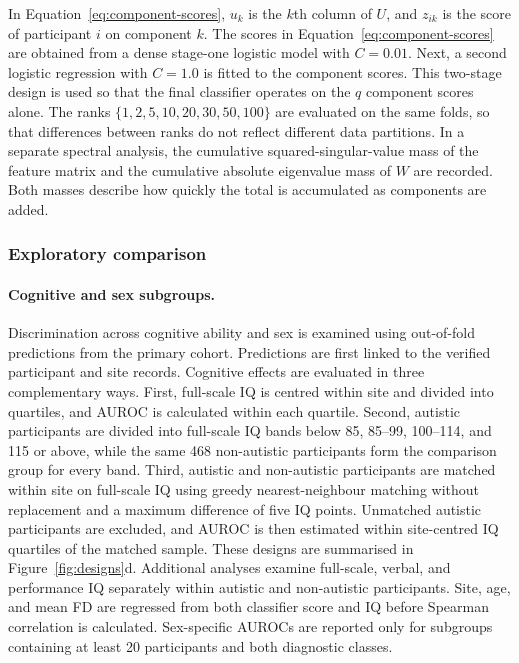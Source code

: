 In Equation~\eqref{eq:component-scores}, $u_k$ is the $k$th column of $U$, and $z_{ik}$ is the score of
participant $i$ on component $k$. The scores in Equation~\eqref{eq:component-scores} are obtained from a
dense stage-one logistic model with $C=0.01$. Next, a second logistic regression with
$C=1.0$ is fitted to the component scores. This two-stage design is used so that the final
classifier operates on the $q$ component scores alone. The ranks $\{1,2,5,10,20,30,50,100\}$
are evaluated on the same folds, so that differences between ranks do not reflect different
data partitions. In a separate spectral analysis, the cumulative squared-singular-value mass
of the feature matrix and the cumulative absolute eigenvalue mass of $W$ are recorded. Both
masses describe how quickly the total is accumulated as components are added.

\subsubsection{Exploratory comparison}
\label{subsubsec:exploratory-comparisons}

\paragraph{\textbf{Cognitive and sex subgroups.}}
\label{par:cognitive-sex-subgroups}
Discrimination across cognitive ability and sex is examined using out-of-fold predictions from the primary cohort. Predictions are first linked to the verified participant and site records. Cognitive effects are evaluated in three complementary ways. First, full-scale IQ is centred within site and divided into quartiles, and AUROC is calculated within each quartile. Second, autistic participants are divided into full-scale IQ bands below 85, 85--99, 100--114, and 115 or above, while the same 468 non-autistic participants form the comparison group for every band. Third, autistic and non-autistic participants are matched within site on full-scale IQ using greedy nearest-neighbour matching without replacement and a maximum difference of five IQ points. Unmatched autistic participants are excluded, and AUROC is then estimated within site-centred IQ quartiles of the matched sample. These designs are summarised in Figure~\ref{fig:designs}d. Additional analyses examine full-scale, verbal, and performance IQ separately within autistic and non-autistic participants. Site, age, and mean FD are regressed from both classifier score and IQ before Spearman correlation is calculated. Sex-specific AUROCs are reported only for subgroups containing at least 20 participants and both diagnostic classes.

